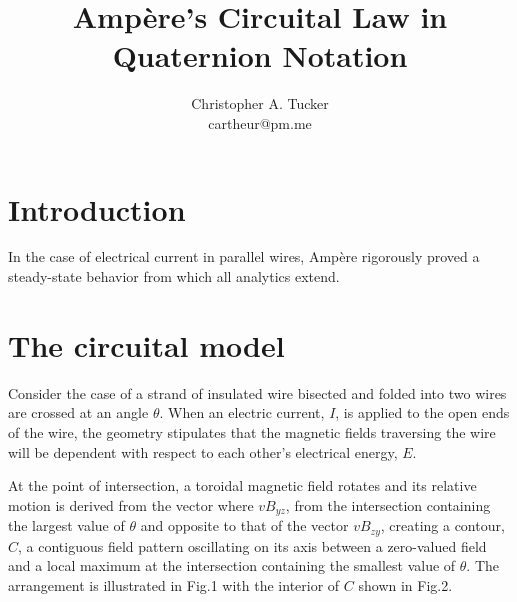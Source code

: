 \documentclass[]{article}
\begin{document}
\title{Amp\`ere's Circuital Law in Quaternion Notation}

\author{Christopher A. Tucker\\cartheur@pm.me\\}


\maketitle


\section{Introduction}
In the case of electrical current in parallel wires, Amp\`ere rigorously proved a steady-state behavior from which all analytics extend. 

\section{The circuital model}
Consider the case of a strand of insulated wire bisected and folded into two wires are crossed at an angle $\theta$. When an electric current, $I$, is applied to the open ends of the wire, the geometry stipulates that the magnetic fields traversing the wire will be dependent with respect to each other's electrical energy, $E$.

At the point of intersection, a toroidal magnetic field rotates and its relative motion is derived from the vector where $v{{B}_{yz}}$, from the intersection containing the largest value of $\theta$ and opposite to that of the vector $v{{B}_{zy}}$, creating a contour, $C$, a contiguous field pattern oscillating on its axis between a zero-valued field and a local maximum at the intersection containing the smallest value of $\theta$. The arrangement is illustrated in Fig.1 with the interior of $C$ shown in Fig.2.
\end{document}
